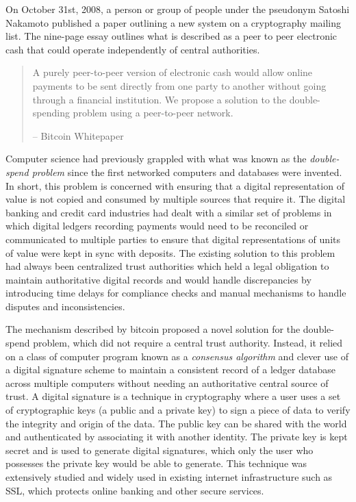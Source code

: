 On October 31st, 2008, a person or group of people under the pseudonym Satoshi
Nakamoto published \cite{nakamoto_bitcoin_2008} a paper outlining a new system on a
cryptography mailing list. The nine-page essay outlines what is described as a
peer to peer electronic cash that could operate independently of central
authorities.


\begin{quote}
A purely peer-to-peer version of electronic cash would allow online
payments to be sent directly from one party to another without going
through a financial institution. We propose a solution to the
double-spending problem using a peer-to-peer network.
\begin{flushright}
-- Bitcoin Whitepaper
\end{flushright}
\end{quote}

Computer science had previously grappled with what was known as the
\textit{double-spend problem} since the first networked computers and databases
were invented. In short, this problem is concerned with ensuring that a digital
representation of value is not copied and consumed by multiple sources that
require it. The digital banking and credit card industries had dealt with a
similar set of problems in which digital ledgers recording payments would need
to be reconciled or communicated to multiple parties to ensure that digital
representations of units of value were kept in sync with deposits. The existing
solution to this problem had always been centralized trust authorities which
held a legal obligation to maintain authoritative digital records and would
handle discrepancies by introducing time delays for compliance checks and manual
mechanisms to handle disputes and inconsistencies.


The mechanism described by bitcoin proposed a novel solution for the
double-spend problem, which did not require a central trust authority. Instead,
it relied on a class of computer program known as a \textit{consensus algorithm}
and clever use of a digital signature scheme to maintain a consistent record of
a ledger database across multiple computers without needing an authoritative
central source of trust. A digital signature is a technique in cryptography
where a user uses a set of cryptographic keys (a public and a private key) to
sign a piece of data to verify the integrity and origin of the data. The public
key can be shared with the world and authenticated by associating it with
another identity. The private key is kept secret and is used to generate digital
signatures, which only the user who possesses the private key would be able to
generate. This technique was extensively studied and widely used in existing
internet infrastructure such as SSL, which protects online banking and other
secure services.

